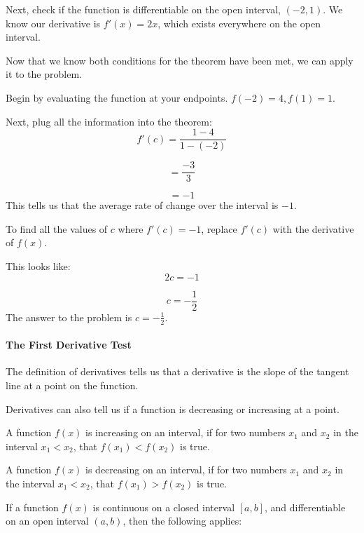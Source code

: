 Next, check if the function is differentiable on the open interval, $(-2,1)$. We know our derivative is $f'(x) = 2x$, which exists everywhere on the open interval.



Now that we know both conditions for the theorem have been met, we can apply it to the problem.



Begin by evaluating the function at your endpoints. $f(-2) = 4, f(1) = 1$.



Next, plug all the information into the theorem:
$$
f'(c) = \frac{1 - 4}{1 - (-2)}
$$



$$
= \frac{-3}{3}
$$



$$
= -1
$$
This tells us that the average rate of change over the interval is $-1$.



To find all the values of $c$ where $f'(c) = -1$, replace $f'(c)$ with the derivative of $f(x)$.



This looks like:
$$
2c = -1
$$



$$
c = -\frac{1}{2}
$$
The answer to the problem is $c = -\frac{1}{2}$.



\paragraph{The First Derivative Test}



The definition of derivatives tells us that a derivative is the slope of the tangent line at a point on the function.



Derivatives can also tell us if a function is decreasing or increasing at a point.



A function $f(x)$ is increasing on an interval, if for two numbers $x_1$ and $x_2$ in the interval $x_1 < x_2$, that $f(x_1) < f(x_2)$ is true.



A function $f(x)$ is decreasing on an interval, if for two numbers $x_1$ and $x_2$ in the interval $x_1 < x_2$, that $f(x_1) > f(x_2)$ is true.



If a function $f(x)$ is continuous on a closed interval $[a,b]$, and differentiable on an open interval $(a,b)$, then the following applies:



